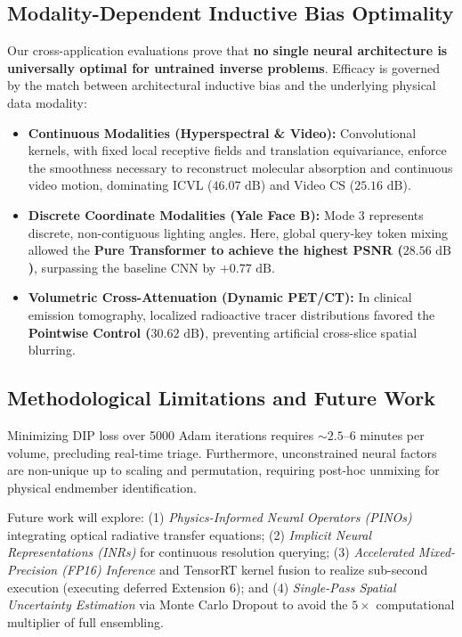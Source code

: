 \subsection{Modality-Dependent Inductive Bias Optimality}
\label{subsec:inductive_bias_insights}
Our cross-application evaluations prove that \textbf{no single neural architecture is universally optimal for untrained inverse problems}. Efficacy is governed by the match between architectural inductive bias and the underlying physical data modality:
\begin{itemize}
    \item \textbf{Continuous Modalities (Hyperspectral \& Video):} Convolutional kernels, with fixed local receptive fields and translation equivariance, enforce the smoothness necessary to reconstruct molecular absorption and continuous video motion, dominating ICVL ($46.07\text{ dB}$) and Video CS ($25.16\text{ dB}$).
    \item \textbf{Discrete Coordinate Modalities (Yale Face B):} Mode 3 represents discrete, non-contiguous lighting angles. Here, global query-key token mixing allowed the \textbf{Pure Transformer to achieve the highest PSNR ($28.56\text{ dB}$)}, surpassing the baseline CNN by \textbf{$+0.77\text{ dB}$}.
    \item \textbf{Volumetric Cross-Attenuation (Dynamic PET/CT):} In clinical emission tomography, localized radioactive tracer distributions favored the \textbf{Pointwise Control ($30.62\text{ dB}$)}, preventing artificial cross-slice spatial blurring.
\end{itemize}

\subsection{Methodological Limitations and Future Work}
\label{subsec:limitations_future}
Minimizing DIP loss over 5000 Adam iterations requires $\sim 2.5\text{--}6$ minutes per volume, precluding real-time triage. Furthermore, unconstrained neural factors are non-unique up to scaling and permutation, requiring post-hoc unmixing for physical endmember identification.

Future work will explore: (1) \textit{Physics-Informed Neural Operators (PINOs)} integrating optical radiative transfer equations; (2) \textit{Implicit Neural Representations (INRs)} for continuous resolution querying; (3) \textit{Accelerated Mixed-Precision (FP16) Inference} and TensorRT kernel fusion to realize sub-second execution (executing deferred Extension 6); and (4) \textit{Single-Pass Spatial Uncertainty Estimation} via Monte Carlo Dropout to avoid the $5\times$ computational multiplier of full ensembling.
